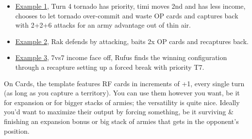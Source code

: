 \begin{itemize}
    \item \href{https://www.warzone.com/MultiPlayer?GameID=38269700}{Example 1}, Turn 4 tornado has priority, timi moves 2nd and has less income, chooses to let tornado over-commit and waste OP cards and captures back with 2+2+6 attacks for an army advantage out of thin air.
    \item \href{https://www.warzone.com/MultiPlayer?GameID=38340477}{Example 2}, Rak defends by attacking, baits 2x OP cards and recaptures back.
    \item \href{https://www.warzone.com/MultiPlayer?GameID=38970219}{Example 3}, 7vs7 income face off, Rufus finds the winning configuration through a recapture setting up a forced break with priority T7.
\end{itemize}

On Cards, the template features RF cards in increments of +1, every single turn (as long as you capture a territory). You can use them however you want, be it for expansion or for bigger stacks of armies; the versatility is quite nice. Ideally you'd want to maximize their output by forcing something, be it surviving \& finishing an expansion bonus or big stack of armies that gets in the opponent's position.
\\
\\